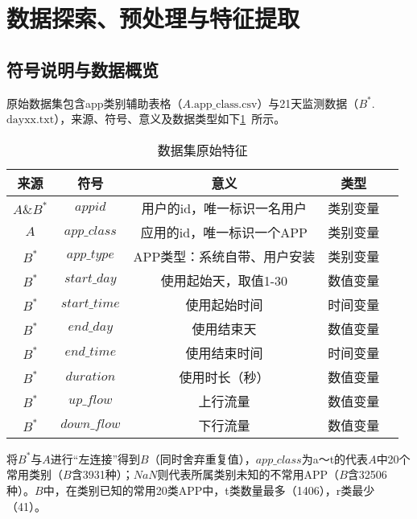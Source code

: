 \documentclass[withoutpreface,bwprint]{cumcmthesis}
\begin{document}
\tableofcontents
\newpage

\pagestyle{mainmatterstyle}
\setcounter{page}{1}
\section{数据探索、预处理与特征提取}

\subsection{符号说明与数据概览}

原始数据集包含app类别辅助表格（$A$.$\text{app\_class.csv}$）与21天监测数据（$B^*$.$\text{dayxx.txt}$），来源、符号、意义及数据类型如下\cref{tab:001}~所示。

\begin{table}[!htbp]
    \caption{数据集原始特征}\label{tab:001} \centering
    \begin{tabular}{ccccc}
        \toprule[1.5pt]
        来源       & 符号            & 意义              & 类型   \\
        \midrule[1pt]
        $A\&B^*$ & $appid$       & 用户的id，唯一标识一名用户  & 类别变量 \\
        $A$      & $app\_class$  & 应用的id，唯一标识一个APP & 类别变量 \\
        $B^*$    & $app\_type$   & APP类型：系统自带、用户安装 & 类别变量 \\
        $B^*$    & $start\_day$  & 使用起始天，取值1-30    & 数值变量 \\
        $B^*$    & $start\_time$ & 使用起始时间          & 时间变量 \\
        $B^*$    & $end\_day$    & 使用结束天           & 数值变量 \\
        $B^*$    & $end\_time$   & 使用结束时间          & 时间变量 \\
        $B^*$    & $duration$    & 使用时长（秒）         & 数值变量 \\
        $B^*$    & $up\_flow$    & 上行流量            & 数值变量 \\
        $B^*$    & $down\_flow$  & 下行流量            & 数值变量 \\
        \bottomrule[1.5pt]
    \end{tabular}
\end{table}

将$B^*$与$A$进行“左连接”得到$B$（同时舍弃重复值），$app\_class$为a～t的代表$A$中20个常用类别（$B$含3931种）；$NaN$则代表所属类别未知的不常用APP（$B$含32506种）。$B$中，在类别已知的常用20类APP中，t类数量最多（1406），r类最少（41）。
\end{document}
